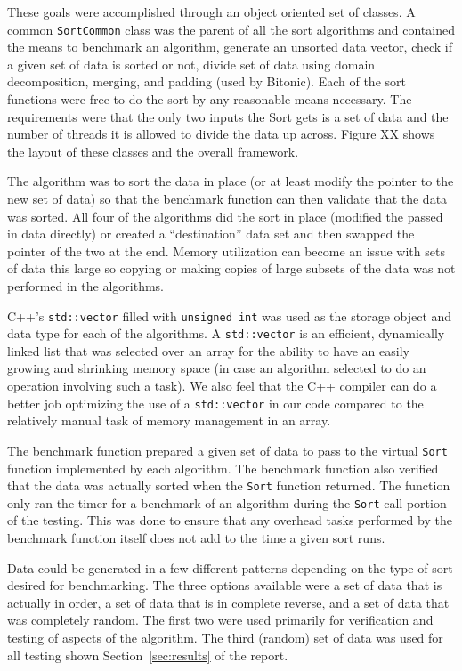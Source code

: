 \documentclass[journal]{IEEEtran}
\begin{document}
These goals were accomplished through an object oriented set of classes. A common \texttt{SortCommon} class was the parent of all the sort algorithms and contained the means to benchmark an algorithm, generate an unsorted data vector, check if a given set of data is sorted or not, divide set of data using domain decomposition, merging, and padding (used by Bitonic). Each of the sort functions were free to do the sort by any reasonable means necessary. The requirements were that the only two inputs the Sort gets is a set of data and the number of threads it is allowed to divide the data up across. Figure XX shows the layout of these classes and the overall framework.

The algorithm was to sort the data in place (or at least modify the pointer to the new set of data) so that the benchmark function can then validate that the data was sorted. All four of the algorithms did the sort in place (modified the passed in data directly) or created a ``destination'' data set and then swapped the pointer of the two at the end. Memory utilization can become an issue with sets of data this large so copying or making copies of large subsets of the data was not performed in the algorithms.

C++'s \texttt{std::vector} filled with \texttt{unsigned int} was used as the storage object and data type for each of the algorithms. A \texttt{std::vector} is an efficient, dynamically linked list that was selected over an array for the ability to have an easily growing and shrinking memory space (in case an algorithm selected to do an operation involving such a task). We also feel that the C++ compiler can do a better job optimizing the use of a \texttt{std::vector} in our code compared to the relatively manual task of memory management in an array.

The benchmark function prepared a given set of data to pass to the virtual \texttt{Sort} function implemented by each algorithm. The benchmark function also verified that the data was actually sorted when the \texttt{Sort} function returned. The function only ran the timer for a benchmark of an algorithm during the \texttt{Sort} call portion of the testing. This was done to ensure that any overhead tasks performed by the benchmark function itself does not add to the time a given sort runs.

Data could be generated in a few different patterns depending on the type of sort desired for benchmarking. The three options available were a set of data that is actually in order, a set of data that is in complete reverse, and a set of data that was completely random. The first two were used primarily for verification and testing of aspects of the algorithm. The third (random) set of data was used for all testing shown Section~\ref{sec:results} of the report.
\end{document}
